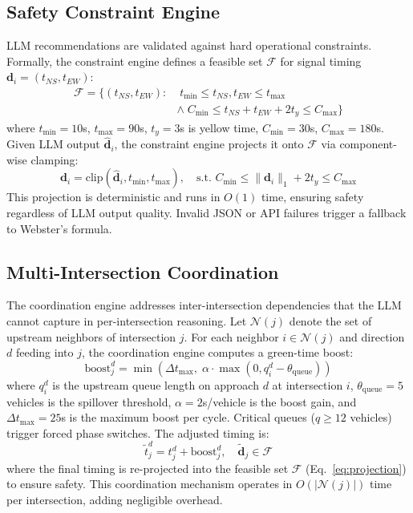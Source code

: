 \documentclass[conference]{IEEEtran}
\begin{document}
\subsection{Safety Constraint Engine}
\label{sec:constraint}
LLM recommendations are validated against hard operational constraints. Formally, the constraint engine defines a feasible set $\mathcal{F}$ for signal timing $\mathbf{d}_i = (t_{NS}, t_{EW})$:
\begin{align}
    \mathcal{F} = \{(t_{NS}, t_{EW}) : &\; t_{\min} \leq t_{NS}, t_{EW} \leq t_{\max} \label{eq:green} \\
    &\land\; C_{\min} \leq t_{NS} + t_{EW} + 2t_y \leq C_{\max}\} \label{eq:cycle}
\end{align}
where $t_{\min}=10$s, $t_{\max}=90$s, $t_y=3$s is yellow time, $C_{\min}=30$s, $C_{\max}=180$s. Given LLM output $\hat{\mathbf{d}}_i$, the constraint engine projects it onto $\mathcal{F}$ via component-wise clamping:
\begin{equation}
    \mathbf{d}_i = \text{clip}(\hat{\mathbf{d}}_i, t_{\min}, t_{\max}), \quad \text{s.t. } C_{\min} \leq \|\mathbf{d}_i\|_1 + 2t_y \leq C_{\max}
    \label{eq:projection}
\end{equation}
This projection is deterministic and runs in $O(1)$ time, ensuring safety regardless of LLM output quality. Invalid JSON or API failures trigger a fallback to Webster's formula.

\subsection{Multi-Intersection Coordination}
\label{sec:coord}
The coordination engine addresses inter-intersection dependencies that the LLM cannot capture in per-intersection reasoning. Let $\mathcal{N}(j)$ denote the set of upstream neighbors of intersection $j$. For each neighbor $i \in \mathcal{N}(j)$ and direction $d$ feeding into $j$, the coordination engine computes a green-time boost:
\begin{equation}
    \text{boost}_j^{d} = \min\left(\Delta t_{\max},\; \alpha \cdot \max(0, q_i^{d} - \theta_{\text{queue}})\right)
    \label{eq:coord}
\end{equation}
where $q_i^{d}$ is the upstream queue length on approach $d$ at intersection $i$, $\theta_{\text{queue}}=5$ vehicles is the spillover threshold, $\alpha=2$s/vehicle is the boost gain, and $\Delta t_{\max}=25$s is the maximum boost per cycle. Critical queues ($q \geq 12$ vehicles) trigger forced phase switches. The adjusted timing is:
\begin{equation}
    \tilde{t}_j^{d} = t_j^{d} + \text{boost}_j^{d}, \quad \tilde{\mathbf{d}}_j \in \mathcal{F}
    \label{eq:coord_apply}
\end{equation}
where the final timing is re-projected into the feasible set $\mathcal{F}$ (Eq.~\ref{eq:projection}) to ensure safety. This coordination mechanism operates in $O(|\mathcal{N}(j)|)$ time per intersection, adding negligible overhead.
\end{document}
